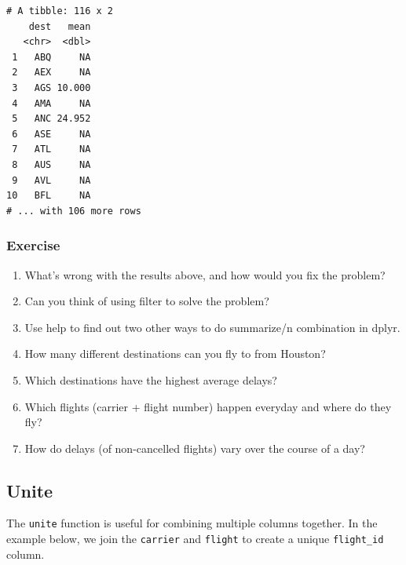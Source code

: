 \documentclass[]{article}
\newenvironment{Shaded}{\begin{snugshade}}{\end{snugshade}}
\newcommand{\KeywordTok}[1]{\textcolor[rgb]{0.13,0.29,0.53}{\textbf{{#1}}}}
\newcommand{\DataTypeTok}[1]{\textcolor[rgb]{0.13,0.29,0.53}{{#1}}}
\newcommand{\StringTok}[1]{\textcolor[rgb]{0.31,0.60,0.02}{{#1}}}
\newcommand{\OtherTok}[1]{\textcolor[rgb]{0.56,0.35,0.01}{{#1}}}
\newcommand{\NormalTok}[1]{{#1}}
\providecommand{\tightlist}{%
  \setlength{\itemsep}{0pt}\setlength{\parskip}{0pt}}
\theoremstyle{definition}
\theoremstyle{definition}
\theoremstyle{definition}
\theoremstyle{remark}
\begin{document}
\begin{verbatim}
# A tibble: 116 x 2
    dest   mean
   <chr>  <dbl>
 1   ABQ     NA
 2   AEX     NA
 3   AGS 10.000
 4   AMA     NA
 5   ANC 24.952
 6   ASE     NA
 7   ATL     NA
 8   AUS     NA
 9   AVL     NA
10   BFL     NA
# ... with 106 more rows
\end{verbatim}

\subsubsection{Exercise}\label{exercise-3}

\begin{enumerate}
\def\labelenumi{\arabic{enumi}.}
\tightlist
\item
  What's wrong with the results above, and how would you fix the
  problem?
\item
  Can you think of using filter to solve the problem?
\item
  Use help to find out two other ways to do summarize/n combination in
  dplyr.
\item
  How many different destinations can you fly to from Houston?
\item
  Which destinations have the highest average delays?
\item
  Which flights (carrier + flight number) happen everyday and where do
  they fly?
\item
  How do delays (of non-cancelled flights) vary over the course of a
  day?
\end{enumerate}

\subsection{Unite}\label{unite}

The \texttt{unite} function is useful for combining multiple columns
together. In the example below, we join the \texttt{carrier} and
\texttt{flight} to create a unique \texttt{flight\_id} column.

\begin{Shaded}
\end{Shaded}
\end{document}
